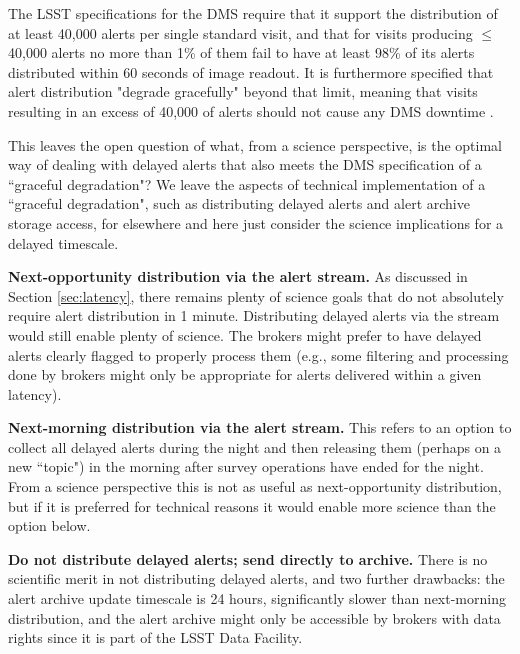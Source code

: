 \documentclass[DM,lsstdraft,authoryear,toc]{lsstdoc}
\begin{document}
The LSST specifications for the DMS require that it support the distribution of at least 40,000 alerts per single standard visit, and that for visits producing $\leq$40,000 alerts  no more than 1\% of them fail to have at least 98\% of its alerts distributed within 60 seconds of image readout.
It is furthermore specified that alert distribution "degrade gracefully" beyond that limit, meaning that visits resulting in an excess of 40,000 of alerts should not cause any DMS downtime .

This leaves the open question of what, from a science perspective, is the optimal way of dealing with delayed alerts that also meets the DMS specification of a ``graceful degradation"?
We leave the aspects of technical implementation of a ``graceful degradation", such as distributing delayed alerts and alert archive storage access, for elsewhere and here just consider the science implications for a delayed timescale.

{\bf Next-opportunity distribution via the alert stream.} As discussed in Section \ref{sec:latency}, there remains plenty of science goals that do not absolutely require alert distribution in 1 minute.
Distributing delayed alerts via the stream would still enable plenty of science.
The brokers might prefer to have delayed alerts clearly flagged to properly process them (e.g., some filtering and processing done by brokers might only be appropriate for alerts delivered within a given latency).

{\bf Next-morning distribution via the alert stream.} This refers to an option to collect all delayed alerts during the night and then releasing them (perhaps on a new ``topic") in the morning after survey operations have ended for the night.
From a science perspective this is not as useful as next-opportunity distribution, but if it is preferred for technical reasons it would enable more science than the option below.

{\bf Do not distribute delayed alerts; send directly to archive.} There is no scientific merit in not distributing delayed alerts, and two further drawbacks: the alert archive update timescale is 24 hours, significantly slower than next-morning distribution, and the alert archive might only be accessible by brokers with data rights since it is part of the LSST Data Facility.
\end{document}
